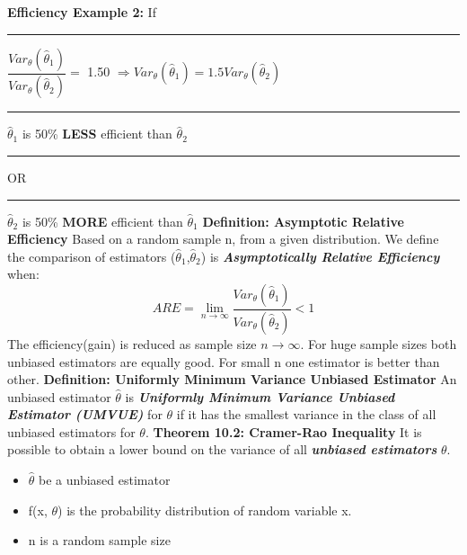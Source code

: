 \documentclass[]{article}
\begin{document}
\newline
\newline
\textbf{Efficiency Example 2:}  If \Large\rule{.3cm}{0pt}$\dfrac{  Var_\theta (\hat\theta_1)  }{ Var_\theta (\hat\theta_2)}  = $  1.50 $\Longrightarrow  Var_\theta (\hat\theta_1) = 1.5  Var_\theta (\hat\theta_2) $ 
\newline\newline\Large\rule{10cm}{0pt}  $\hat\theta_1$ is 50\% \textbf{LESS} efficient than $\hat\theta_2$
\newline\Large\rule{13cm}{0pt}   OR
\newline\Large\rule{10cm}{0pt}  $\hat\theta_2$ is 50\% \textbf{MORE} efficient than $\hat\theta_1$
\newline
\newline
\newline
\newline
\Large\textbf{Definition: Asymptotic Relative Efficiency}
\newline
\Large Based on a random sample n, from a given distribution. We define the comparison of estimators ($\hat\theta_1$,$\hat\theta_2$) is \textbf{\textit{Asymptotically Relative Efficiency}}  when: \newline
\[ ARE = \lim_{n\to\infty}  \dfrac{  Var_\theta (\hat\theta_1)  }{ Var_\theta (\hat\theta_2)}  <  1 \] 
The efficiency(gain) is reduced as sample size ${n\to\infty}$. For huge sample sizes both unbiased estimators are equally good. For small n one estimator is better than other.
\newline
\newline
\Large\textbf{Definition: Uniformly Minimum Variance Unbiased Estimator}
\newline
\Large An unbiased estimator $\hat\theta$ is \textbf{\textit{Uniformly Minimum Variance Unbiased Estimator (UMVUE)}} for $\theta$ if it has the smallest variance in the class of all unbiased estimators for $\theta$.
\newline
\newline
\Large\textbf{Theorem 10.2: Cramer-Rao Inequality}
\newline
\Large It is possible to obtain a lower bound on the variance of all \textbf{\textit{unbiased estimators}} $\theta$.
\begin{itemize}
	\item $\hat\theta$ be a unbiased estimator 
	\item f(x, $\theta$) is the probability distribution of random variable x.
	\item n is a random sample size
\end{itemize}
\end{document}
